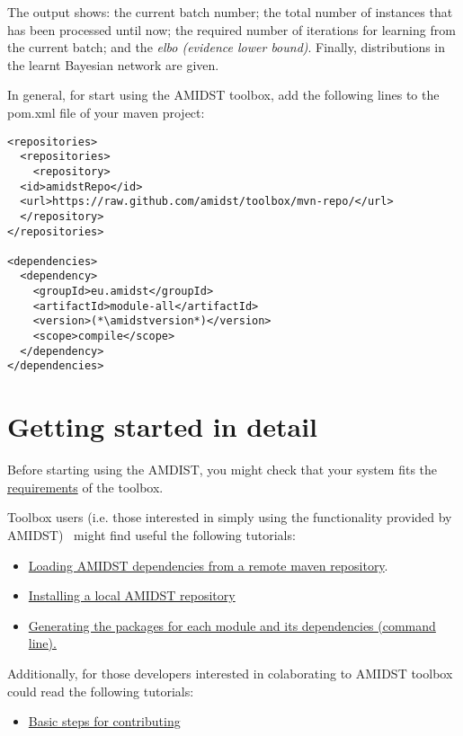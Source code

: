\documentclass[10pt,a4paper]{report}
\begin{document}
The output shows: the current batch number; the total number of instances that has been processed until now; the required number of iterations for learning from the current batch; and the \textit{elbo (evidence lower bound)}. Finally,  distributions in the learnt Bayesian network are given.

In general, for start using the AMIDST toolbox, add the following lines to the pom.xml file of your maven project:




\begin{lstlisting}
<repositories>
  <repositories>
    <repository>
  <id>amidstRepo</id>
  <url>https://raw.github.com/amidst/toolbox/mvn-repo/</url>
  </repository>
</repositories>

<dependencies>
  <dependency>
    <groupId>eu.amidst</groupId>
    <artifactId>module-all</artifactId>
    <version>(*\amidstversion*)</version>
    <scope>compile</scope>
  </dependency>
</dependencies>	
\end{lstlisting}


\section{Getting started in detail}

Before starting using the AMDIST, you might check that your system fits
the \href{requirements.html}{requirements} of the toolbox.\newline 

Toolbox users (i.e. those interested in simply using the functionality
provided by AMIDST)~ might find useful the following tutorials:

\begin{itemize}
	\item
	\href{remoteDeps.html}{Loading AMIDST dependencies from a remote maven
		repository}.
	\item \href{localDeps.html}{Installing a local AMIDST repository}
	\item \href{copydep.html}{Generating the packages for each module and its
		dependencies (command line).}
\end{itemize}

Additionally, for those developers interested in colaborating to AMIDST toolbox could read the following tutorials:

\begin{itemize}
	\item \href{amidst_team_modifications.html}{Basic steps for contributing}
\end{itemize}
\end{document}
